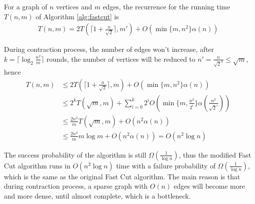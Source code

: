 \documentclass[12pt]{article}
\theoremstyle{plain}
\begin{document}


For a graph of $n$ vertices and $m$ edges, the recurrence for the running time $T(n,m)$ of Algorithm \ref{alg:fastcut} is
\begin{align*}
    T(n,m)=2T\left(\lceil 1+\frac{n}{\sqrt{2}}\rceil,m'\right)+O(\min\{m,n^2\}\alpha(n))
\end{align*}

During contraction process, the number of edges won't increase, after $k=\lceil \log_2\frac{n^2}{m}\rceil$ rounds, the number of vertices will be reduced to $n'=\frac{n}{\sqrt{2}^k}\leq \sqrt{m}$, hence
\begin{align*}
    T(n,m)&\leq 2T\left(\lceil 1+\frac{n}{\sqrt{2}}\rceil,m\right)+O(\min\{m,n^2\}\alpha(n))\\
    &\leq 2^{k}T(\sqrt{m}, m)+\sum_{i=0}^{k} 2^{i}O(\min\{m,\frac{n^2}{2^i}\}\alpha(\frac{n^2}{\sqrt{2}^i}))\\
    &\leq\frac{2n^2}{m}T(\sqrt{m},m)+O(n^2\alpha(n))\\
    &\leq \frac{2n^2}{m}m\log m+O(n^2\alpha(n))=O(n^2\log n)
\end{align*}

The success probability of the algorithm is still $\Omega(\frac{1}{\log n})$, thus the modified Fast Cut algorithm runs in $O(n^2\log n)$ time with a failure probability of $\Omega(\frac{1}{\log n})$, which is the same as the original Fast Cut algorithm. The main reason is that during contraction process, a sparse graph with $O(n)$ edges will become more and more dense, until almost complete, which is a bottleneck.
\end{document}
